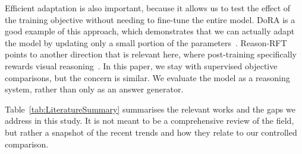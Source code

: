 Efficient adaptation is also important,
because it allows us to test the effect of the training objective without needing to fine-tune the entire model.
DoRA is a good example of this approach, which demonstrates that we can actually adapt the model by updating only a small portion of the parameters~\cite{liu2024dora}.
Reason-RFT points to another direction that is relevant here, where post-training specifically rewards visual reasoning~\cite{tan2025reasonrft}.
In this paper, we stay with supervised objective comparisons, but the concern is similar.
We evaluate the model as a reasoning system, rather than only as an answer generator.

Table~\ref{tab:LiteratureSummary} summarises the relevant works and the gaps we address in this study.
It is not meant to be a comprehensive review of the field, but rather a snapshot of the recent trends and how they relate to our controlled comparison.

